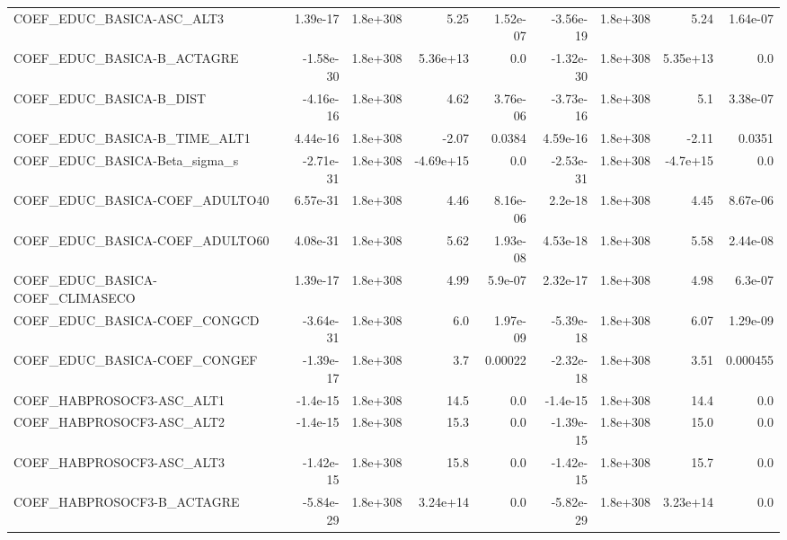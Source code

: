 \begin{tabular}{lrrrrrrrr}
COEF\_EDUC\_BASICA-ASC\_ALT3         &    1.39e-17 &     1.8e+308 &      5.25 & 1.52e-07 &  -3.56e-19 &    1.8e+308 &         5.24 &      1.64e-07 \\
COEF\_EDUC\_BASICA-B\_ACTAGRE        &   -1.58e-30 &     1.8e+308 &  5.36e+13 &      0.0 &  -1.32e-30 &    1.8e+308 &     5.35e+13 &           0.0 \\
COEF\_EDUC\_BASICA-B\_DIST           &   -4.16e-16 &     1.8e+308 &      4.62 & 3.76e-06 &  -3.73e-16 &    1.8e+308 &          5.1 &      3.38e-07 \\
COEF\_EDUC\_BASICA-B\_TIME\_ALT1      &    4.44e-16 &     1.8e+308 &     -2.07 &   0.0384 &   4.59e-16 &    1.8e+308 &        -2.11 &        0.0351 \\
COEF\_EDUC\_BASICA-Beta\_sigma\_s     &   -2.71e-31 &     1.8e+308 & -4.69e+15 &      0.0 &  -2.53e-31 &    1.8e+308 &     -4.7e+15 &           0.0 \\
COEF\_EDUC\_BASICA-COEF\_ADULTO40    &    6.57e-31 &     1.8e+308 &      4.46 & 8.16e-06 &    2.2e-18 &    1.8e+308 &         4.45 &      8.67e-06 \\
COEF\_EDUC\_BASICA-COEF\_ADULTO60    &    4.08e-31 &     1.8e+308 &      5.62 & 1.93e-08 &   4.53e-18 &    1.8e+308 &         5.58 &      2.44e-08 \\
COEF\_EDUC\_BASICA-COEF\_CLIMASECO   &    1.39e-17 &     1.8e+308 &      4.99 &  5.9e-07 &   2.32e-17 &    1.8e+308 &         4.98 &       6.3e-07 \\
COEF\_EDUC\_BASICA-COEF\_CONGCD      &   -3.64e-31 &     1.8e+308 &       6.0 & 1.97e-09 &  -5.39e-18 &    1.8e+308 &         6.07 &      1.29e-09 \\
COEF\_EDUC\_BASICA-COEF\_CONGEF      &   -1.39e-17 &     1.8e+308 &       3.7 &  0.00022 &  -2.32e-18 &    1.8e+308 &         3.51 &      0.000455 \\
COEF\_HABPROSOCF3-ASC\_ALT1         &    -1.4e-15 &     1.8e+308 &      14.5 &      0.0 &   -1.4e-15 &    1.8e+308 &         14.4 &           0.0 \\
COEF\_HABPROSOCF3-ASC\_ALT2         &    -1.4e-15 &     1.8e+308 &      15.3 &      0.0 &  -1.39e-15 &    1.8e+308 &         15.0 &           0.0 \\
COEF\_HABPROSOCF3-ASC\_ALT3         &   -1.42e-15 &     1.8e+308 &      15.8 &      0.0 &  -1.42e-15 &    1.8e+308 &         15.7 &           0.0 \\
COEF\_HABPROSOCF3-B\_ACTAGRE        &   -5.84e-29 &     1.8e+308 &  3.24e+14 &      0.0 &  -5.82e-29 &    1.8e+308 &     3.23e+14 &           0.0 \\

\end{tabular}
